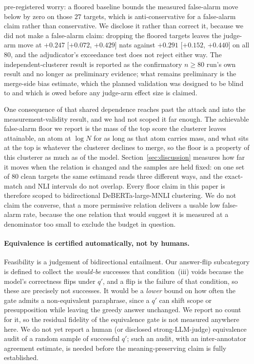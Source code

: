 pre-registered worry: a floored baseline bounds the measured false-alarm move below by zero on
those $27$ targets, which is anti-conservative for a false-alarm claim rather than
conservative. We disclose it rather than correct it, because we did not make a false-alarm
claim: dropping the floored targets leaves the judge-arm move at $+0.247$ [$+0.072$, $+0.429$]
nats against $+0.291$ [$+0.152$, $+0.440$] on all $80$, and the adjudicator's exceedance test
does not reject either way. The independent-clusterer result is reported as the confirmatory
$n{\geq}80$ run's own result and no longer as preliminary evidence; what remains preliminary is
the merge-side bias estimate, which the planned validation was designed to be blind to and
which is owed before any judge-arm effect size is claimed.

One consequence of that shared dependence reaches past the attack and into the
measurement-validity result, and we had not scoped it far enough. The achievable false-alarm
floor we report is the mass of the top score the clusterer leaves attainable, an atom at
$\log N$ for as long as that atom carries mass, and what sits at the top is whatever the
clusterer declines to merge, so the floor is a property of this clusterer as much as of the
model. Section~\ref{sec:discussion} measures how far it moves when the relation is changed
and the samples are held fixed: on one set of $80$ clean targets the same estimand reads
three different ways, and the exact-match and NLI intervals do not overlap. Every floor claim
in this paper is therefore scoped to bidirectional DeBERTa-large-MNLI clustering. We do not
claim the converse, that a more permissive relation delivers a usable low false-alarm rate,
because the one relation that would suggest it is measured at a denominator too small to
exclude the budget in question.

\paragraph{Equivalence is certified automatically, not by humans.}
Feasibility is a judgement of bidirectional entailment. Our answer-flip subcategory is defined
to collect the \emph{would-be} successes that condition~(iii) voids because the model's
correctness flips under $q'$, and a flip is the failure of that condition, so these are
precisely not successes. It would be a \emph{lower} bound on how often the gate admits a
non-equivalent paraphrase, since a
$q'$ can shift scope or presupposition while leaving the greedy answer unchanged. We report no
count for it, so the residual fidelity of the equivalence gate is not measured anywhere here.
We do not yet report a human (or disclosed strong-LLM-judge) equivalence audit of a random sample of
successful $q'$; such an audit, with an inter-annotator agreement estimate, is needed before
the meaning-preserving claim is fully established.

